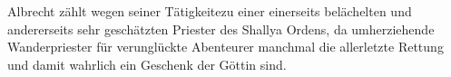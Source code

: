 
Albrecht zählt wegen seiner Tätigkeitezu einer einerseits belächelten und andererseits sehr geschätzten Priester des Shallya Ordens, da umherziehende Wanderpriester für verunglückte Abenteurer manchmal die allerletzte Rettung und damit wahrlich ein Geschenk der Göttin sind.